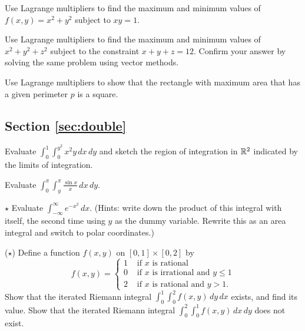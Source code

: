 \documentclass[svgnames]{watsonbook}
\begin{document}
\begin{exercise}{}{}
  Use Lagrange multipliers to find the maximum and minimum values of
  $f(x,y) = x^2 + y^2$ subject to $xy = 1$.
\end{exercise}

\begin{exercise}{}{}
  Use Lagrange multipliers to find the maximum and minimum values of
  $x^2 + y^2 + z^2$ subject to the constraint $x + y + z =
  12$. Confirm your answer by solving the same problem using vector
  methods.
\end{exercise}

\begin{exercise}{}{}
  Use Lagrange multipliers to show that the rectangle with maximum
  area that has a given perimeter $p$ is a square.
\end{exercise}

\subsection*{Section \ref{sec:double}}

\begin{exercise}{}{}
  Evaluate
  $\displaystyle{\int_{0}^{1}\!\int_{0}^{y^2} x^2 y \,dx\,dy}$ and
  sketch the region of integration in $\mathbb{R}^2$ indicated by the limits
  of integration.
\end{exercise}

\begin{exercise}{}{}
  Evaluate $\displaystyle{\int_{0}^\pi \!\int_{y}^{\pi}\frac{\sin x}{x} \,dx\,dy}$.
\end{exercise}

\begin{exercise}{$\star$}{}
  Evaluate $\displaystyle{\int_{-\infty}^{\infty} e^{-x^2}\,dx}$. (Hints: write down
  the product of this integral with itself, the second time using $y$
  as the dummy variable. Rewrite this as an area integral and switch
  to polar coordinates.)
\end{exercise}

\begin{exercise}{($\star$)}{}
  Define a function $f(x,y)$ on $[0,1] \times [0,2]$ by
  \[
    f(x,y) = \left\{ \begin{array}{cl}
                       1 & \text{ if }x\text{ is rational} \\
                       0 & \text{ if }x\text{ is irrational and }y \leq 1 \\
                       2 & \text{ if }x\text{ is rational and }y > 1.
                     \end{array} 
                   \right.
  \]
  Show that the iterated Riemann integral
  $\int_0^1\int_0^2 f(x,y)\,dy\,dx$ exists, and find
  its value. Show that the iterated Riemann integral
  $\int_0^2\int_0^1 f(x,y)\,dx\,dy$ does not exist.
\end{exercise}
\end{document}
